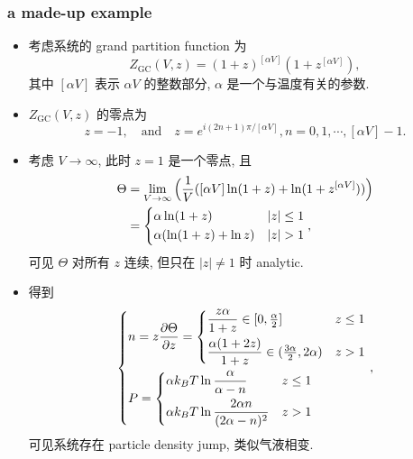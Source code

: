 \subsubsection{a made-up example}
\begin{itemize}
	\item 考虑系统的 grand partition function 为
	\begin{equation}
		Z_\text{GC}(V, z) = (1 + z)^{[\alpha V]} (1 + z^{[\alpha V]}),
	\end{equation}
	其中 $[\alpha V]$ 表示 $\alpha V$ 的整数部分, $\alpha$ 是一个与温度有关的参数.
	
	\item $Z_\text{GC}(V, z)$ 的零点为
	\begin{equation}
		z = - 1, \quad \text{and} \quad z = e^{i (2 n + 1) \pi / [\alpha V]}, n = 0, 1, \cdots, [\alpha V] - 1.
	\end{equation}
	
	\item 考虑 $V \rightarrow \infty$, 此时 $z = 1$ 是一个零点, 且
	\begin{align}
		\Theta &= \lim_{V \rightarrow \infty} \Big( \frac{1}{V} ([\alpha V] \ln(1 + z) + \ln(1 + z^{[\alpha V]})) \Big) \notag \\
		&= \begin{dcases}
			\alpha \ln(1 + z) & |z| \leq 1 \\
			\alpha (\ln(1 + z) + \ln z) & |z| > 1
		\end{dcases},
	\end{align}
	可见 $\Theta$ 对所有 $z$ 连续, 但只在 $|z| \neq 1$ 时 analytic.
	
	\item 得到
	\begin{equation}
		\begin{dcases}
			n = z \frac{\partial \Theta}{\partial z} = \begin{dcases}
				\frac{z \alpha}{1 + z} \in [0, {\textstyle \frac{\alpha}{2}}] & z \leq 1 \\
				\frac{\alpha (1 + 2 z)}{1 + z} \in ({\textstyle \frac{3 \alpha}{2}}, 2 \alpha) & z > 1
			\end{dcases} \\
			P = \begin{dcases}
				\alpha k_B T \ln \frac{\alpha}{\alpha - n} & z \leq 1 \\
				\alpha k_B T \ln \frac{2 \alpha n}{(2 \alpha - n)^2} & z > 1
			\end{dcases}
		\end{dcases},
	\end{equation}
	可见系统存在 particle density jump, 类似气液相变.
\end{itemize}

